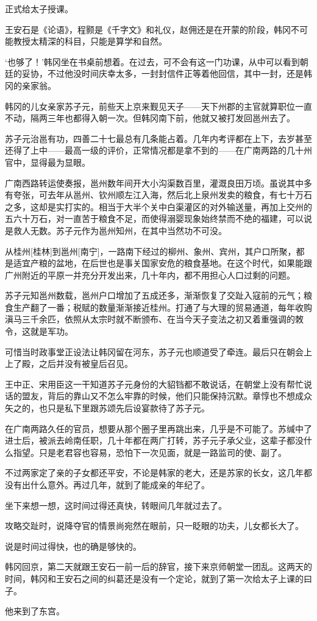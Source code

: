 正式给太子授课。

王安石是《论语》，程颢是《千字文》和礼仪，赵佣还是在开蒙的阶段，韩冈不可能教授太精深的科目，只能是算学和自然。

‘也够了！’韩冈坐在书桌前想着。在过去，可不会有这一门功课，从中可以看到朝廷的妥协，不过他没时间庆幸太多，一封封信件正等着他回信，其中一封，还是韩冈的亲家翁。

韩冈的儿女亲家苏子元，前些天上京来觐见天子——天下州郡的主官就算职位一直不动，隔两三年也都得入朝一次。但韩冈南下前，他就又被打发回邕州去了。

苏子元治邕有功，四善二十七最总有几条能占着。几年内考评都在上下，去岁甚至还得了上中——最高一级的评价，正常情况都是拿不到的——在广南两路的几十州官中，显得最为显眼。

广南西路转运使奏报，邕州数年间开大小沟渠数百里，灌溉良田万顷。虽说其中多有夸张，可去年从邕州、钦州顺左江入海，然后北上泉州发卖的粮食，有七十万石之多，这却是实打实的。相当于大半个关中白渠灌区的对外输送量，再加上交州的五六十万石，对一直苦于粮食不足，而使得溺婴现象始终禁而不绝的福建，可以说是救人无数。苏子元作为邕州知州，在其中当然功不可没。

从桂州[桂林]到邕州[南宁]，一路南下经过的柳州、象州、宾州，其户口所聚，都是适宜产粮的盆地，在后世也是事关国家安危的粮食基地。在这个时代，如果能跟广州附近的平原一并充分开发出来，几十年内，都不用担心人口过剩的问题。

苏子元知邕州数载，邕州户口增加了五成还多，渐渐恢复了交趾入寇前的元气；粮食生产翻了一番；税赋的数量渐渐接近桂州。打通了与大理的贸易通道，每年收购滇马三千余匹，依照从太宗时就不断颁布、在当今天子变法之初又着重强调的敇令，这就是军功。

可惜当时政事堂正设法让韩冈留在河东，苏子元也顺道受了牵连。最后只在朝会上上了殿，之后并没有被皇后召见。

王中正、宋用臣这一干知道苏子元身份的大貂铛都不敢说话，在朝堂上没有帮忙说话的盟友，背后的靠山又不怎么牢靠的时候，他们只能保持沉默。章惇也不想成众矢之的，也只是私下里跟苏颂先后设宴款待了苏子元。

在广南两路久任的官员，想要从那个圈子里再跳出来，几乎是不可能了。苏缄中了进士后，被派去岭南任职，几十年都在两广打转，苏子元子承父业，这辈子都没什么指望。只是老君容也容易，恐怕下一次见面，就是一路监司的使、副了。

不过两家定了亲的子女都还平安，不论是韩家的老大，还是苏家的长女，这几年都没有出什么意外。再过几年，就到了能成亲的年纪了。

坐下来想一想，这时间过得还真快，转眼间几年就过去了。

攻略交趾时，说降夺官的情景尚宛然在眼前，只一眨眼的功夫，儿女都长大了。

说是时间过得快，也的确是够快的。

韩冈回京，第二天就跟王安石一前一后的辞官，接下来京师朝堂一团乱。这两天的时间，韩冈和王安石之间的纠葛还是没有一个定论，就到了第一次给太子上课的曰子。

他来到了东宫。

